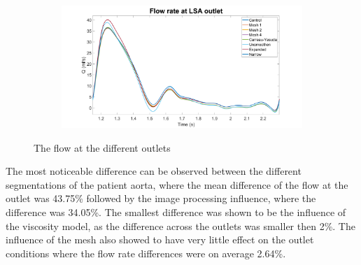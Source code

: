 \begin{figure}
\begin{subfigure}[b]{0.49\textwidth}
     \end{subfigure}
     \hfill
     \begin{subfigure}[b]{0.49\textwidth}
         \centering
         \includegraphics[width=\textwidth]{Figures/QLSA.png}
     \end{subfigure}
        \caption{The flow at the different outlets}
        \label{fig:flow}
\end{figure}

The most noticeable difference can be observed between the different segmentations of the patient aorta, where the mean difference of the flow at the outlet was 43.75\% followed by the image processing influence, where the difference was 34.05\%. The smallest difference was shown to be the influence of the viscosity model, as the difference across the outlets was smaller then 2\%. The influence of the mesh also showed to have very little effect on the outlet conditions where the flow rate differences were on average 2.64\%. \par

\begin{table}[ht!]
\caption{The mean absolute percentage error at the different outlets}
\label{tab:pererr}
\end{table}

